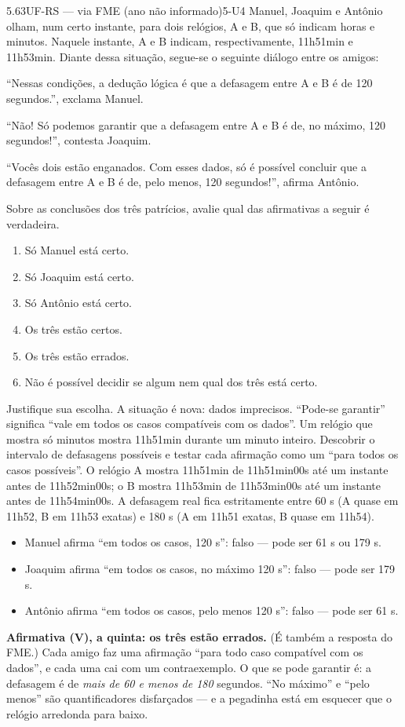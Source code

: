 \begin{exemplo}{5.6}{3}{UF-RS — via FME (ano não informado)}{5-U4}\label{ex:5.6}
Manuel, Joaquim e Antônio olham, num certo instante, para dois relógios, A e B, que só indicam horas e minutos. Naquele instante, A e B indicam, respectivamente, 11h51min e 11h53min. Diante dessa situação, segue-se o seguinte diálogo entre os amigos:
\par\enquote{Nessas condições, a dedução lógica é que a defasagem entre A e B é de 120 segundos.}, exclama Manuel.
\par\enquote{Não! Só podemos garantir que a defasagem entre A e B é de, no máximo, 120 segundos!}, contesta Joaquim.
\par\enquote{Vocês dois estão enganados. Com esses dados, só é possível concluir que a defasagem entre A e B é de, pelo menos, 120 segundos!}, afirma Antônio.
\par Sobre as conclusões dos três patrícios, avalie qual das afirmativas a seguir é verdadeira.
\begin{enumerate}[label=\Roman*.]
  \item Só Manuel está certo.
  \item Só Joaquim está certo.
  \item Só Antônio está certo.
  \item Os três estão certos.
  \item Os três estão errados.
  \item Não é possível decidir se algum nem qual dos três está certo.
\end{enumerate}
Justifique sua escolha.
\plano A situação é nova: dados imprecisos. \enquote{Pode-se garantir} significa \enquote{vale em todos os casos compatíveis com os dados}. Um relógio que mostra só minutos mostra 11h51min durante um minuto inteiro. Descobrir o intervalo de defasagens possíveis e testar cada afirmação como um \enquote{para todos os casos possíveis}.
\resolucao
O relógio A mostra 11h51min de 11h51min00s até um instante antes de 11h52min00s; o B mostra 11h53min de 11h53min00s até um instante antes de 11h54min00s. A defasagem real fica estritamente entre 60 s (A quase em 11h52, B em 11h53 exatas) e 180 s (A em 11h51 exatas, B quase em 11h54).
\begin{itemize}
  \item Manuel afirma \enquote{em todos os casos, 120 s}: falso — pode ser 61 s ou 179 s.
  \item Joaquim afirma \enquote{em todos os casos, no máximo 120 s}: falso — pode ser 179 s.
  \item Antônio afirma \enquote{em todos os casos, pelo menos 120 s}: falso — pode ser 61 s.
\end{itemize}
\textbf{Afirmativa (V), a quinta: os três estão errados.} (É também a resposta do FME.)
\comentario Cada amigo faz uma afirmação \enquote{para todo caso compatível com os dados}, e cada uma cai com um contraexemplo. O que se pode garantir é: a defasagem é de \emph{mais de 60 e menos de 180} segundos. \enquote{No máximo} e \enquote{pelo menos} são quantificadores disfarçados — e a pegadinha está em esquecer que o relógio arredonda para baixo.
\end{exemplo}

